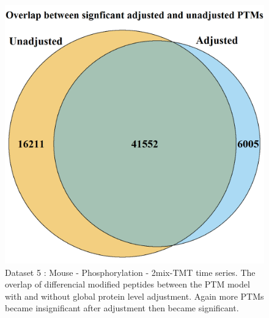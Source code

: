 \documentclass[mcp]{article}
\numberwithin{figure}{section} %
\numberwithin{table}{section}
\begin{document}
\begin{figure}[h!]
\centering
\includegraphics[height=.65\textwidth]{images/shig_venn_diagramm.png}
\caption{Dataset 5 : Mouse - Phosphorylation - 2mix-TMT time series. The overlap of differencial modified peptides between the PTM model with and without global protein level adjustment. Again more PTMs became insignificant after adjustment then became significant.}
\label{fig:shig_venn_d}
\end{figure}
\end{document}
